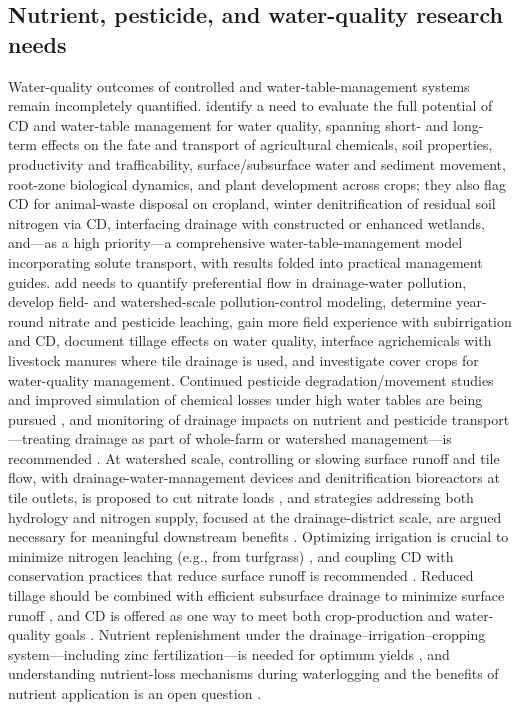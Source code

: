 \documentclass[11pt]{article}
\begin{document}
\subsection{Nutrient, pesticide, and water-quality research needs}
Water-quality outcomes of controlled and water-table-management systems remain incompletely quantified. \textcite{FAUSEY1995} identify a need to evaluate the full potential of CD and water-table management for water quality, spanning short- and long-term effects on the fate and transport of agricultural chemicals, soil properties, productivity and trafficability, surface/subsurface water and sediment movement, root-zone biological dynamics, and plant development across crops; they also flag CD for animal-waste disposal on cropland, winter denitrification of residual soil nitrogen via CD, interfacing drainage with constructed or enhanced wetlands, and---as a high priority---a comprehensive water-table-management model incorporating solute transport, with results folded into practical management guides. \textcite{RITTER1995} add needs to quantify preferential flow in drainage-water pollution, develop field- and watershed-scale pollution-control modeling, determine year-round nitrate and pesticide leaching, gain more field experience with subirrigation and CD, document tillage effects on water quality, interface agrichemicals with livestock manures where tile drainage is used, and investigate cover crops for water-quality management. Continued pesticide degradation/movement studies and improved simulation of chemical losses under high water tables are being pursued \parencite{THOMAS1995}, and monitoring of drainage impacts on nutrient and pesticide transport---treating drainage as part of whole-farm or watershed management---is recommended \parencite{SHIRMOHAMMADI1995}. At watershed scale, controlling or slowing surface runoff and tile flow, with drainage-water-management devices and denitrification bioreactors at tile outlets, is proposed to cut nitrate loads \parencite{Li2015}, and strategies addressing both hydrology and nitrogen supply, focused at the drainage-district scale, are argued necessary for meaningful downstream benefits \parencite{Ikenberry2014}. Optimizing irrigation is crucial to minimize nitrogen leaching (e.g., from turfgrass) \parencite{Filipovic2015}, and coupling CD with conservation practices that reduce surface runoff is recommended \parencite{BinShokrana2023}. Reduced tillage should be combined with efficient subsurface drainage to minimize surface runoff \parencite{Koskiaho2002}, and CD is offered as one way to meet both crop-production and water-quality goals \parencite{Kladivko2005}. Nutrient replenishment under the drainage--irrigation--cropping system---including zinc fertilization---is needed for optimum yields \parencite{Gul2013}, and understanding nutrient-loss mechanisms during waterlogging and the benefits of nutrient application is an open question \parencite{Manik2019}.
\end{document}
